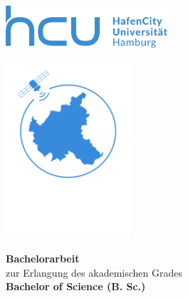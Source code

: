 \begin{titlepage}
	\thispagestyle{empty}
	
	\begin{minipage}[t]{0.4\textwidth}
		\includegraphics[width=60mm]{Daten/hcu_logo.pdf}
	\end{minipage}
	\hfill
	\begin{minipage}[t]{0.5\textwidth}
		\raggedleft
		\includegraphics[width=0.35\textwidth]{Daten/Geo_Logo.pdf}
	\end{minipage}
	
	\vspace{2cm}
	
	\begin {center}
	{\Large \textbf{Bachelorarbeit}}\\
	\vspace{6pt}
	zur Erlangung des akademischen Grades\\
	\vspace{12pt}
	{\Large \textbf{Bachelor of Science (B. Sc.)}}
	\end {center}
	
	\vspace{\fill}
	
	\begin {center}
	\Huge \Titel
	\end {center}
	
	\vspace{\fill}
	

\end{titlepage}
